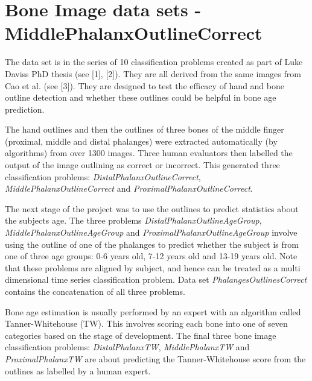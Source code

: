\chapter{Bone Image data sets -\/ Middle\+Phalanx\+Outline\+Correct}
\hypertarget{md_external_2data_2UCRArchive__2018_2MiddlePhalanxOutlineCorrect_2README}{}\label{md_external_2data_2UCRArchive__2018_2MiddlePhalanxOutlineCorrect_2README}
\label{md_external_2data_2UCRArchive__2018_2MiddlePhalanxOutlineCorrect_2README_autotoc_md146}%
%
 The data set is in the series of 10 classification problems created as part of Luke Davis\textquotesingle{}s PhD thesis (see \mbox{[}1\mbox{]}, \mbox{[}2\mbox{]}). They are all derived from the same images from Cao et al. (see \mbox{[}3\mbox{]}). They are designed to test the efficacy of hand and bone outline detection and whether these outlines could be helpful in bone age prediction.

The hand outlines and then the outlines of three bones of the middle finger (proximal, middle and distal phalanges) were extracted automatically (by algorithms) from over 1300 images. Three human evaluators then labelled the output of the image outlining as correct or incorrect. This generated three classification problems\+: {\itshape Distal\+Phalanx\+Outline\+Correct}, {\itshape Middle\+Phalanx\+Outline\+Correct} and {\itshape Proximal\+Phalanx\+Outline\+Correct}.

The next stage of the project was to use the outlines to predict statistics about the subjects age. The three problems {\itshape Distal\+Phalanx\+Outline\+Age\+Group}, {\itshape Middle\+Phalanx\+Outline\+Age\+Group} and {\itshape Proximal\+Phalanx\+Outline\+Age\+Group} involve using the outline of one of the phalanges to predict whether the subject is from one of three age groups\+: 0-\/6 years old, 7-\/12 years old and 13-\/19 years old. Note that these problems are aligned by subject, and hence can be treated as a multi dimensional time series classification problem. Data set {\itshape Phalanges\+Outlines\+Correct} contains the concatenation of all three problems.

Bone age estimation is usually performed by an expert with an algorithm called Tanner-\/\+Whitehouse (TW). This involves scoring each bone into one of seven categories based on the stage of development. The final three bone image classification problems\+: {\itshape Distal\+Phalanx\+TW}, {\itshape Middle\+Phalanx\+TW} and {\itshape Proximal\+Phalanx\+TW} are about predicting the Tanner-\/\+Whitehouse score from the outlines as labelled by a human expert.


